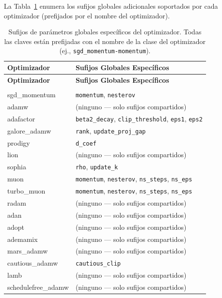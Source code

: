 La Tabla~\ref{tab:optimizer-specific-suffixes} enumera los sufijos globales adicionales soportados por cada optimizador (prefijados por el nombre del optimizador).

\begin{longtable}{>{\ttfamily\footnotesize\raggedright\arraybackslash}p{5.2cm}>{\raggedright\arraybackslash}p{9.7cm}}
\toprule
\textbf{Optimizador} & \textbf{Sufijos Globales Específicos} \\
\midrule
\endfirsthead
\toprule
\textbf{Optimizador} & \textbf{Sufijos Globales Específicos} \\
\midrule
\endhead
\midrule
\multicolumn{2}{r}{\textit{continúa en la página siguiente}} \\
\endfoot
\bottomrule
\caption{Sufijos de parámetros globales específicos del optimizador. Todas las claves están prefijadas con el nombre de la clase del optimizador (ej., \texttt{sgd\_momentum-momentum}).}
\label{tab:optimizer-specific-suffixes}
\endlastfoot
sgd\_momentum & \texttt{momentum}, \texttt{nesterov} \\
adamw & (ninguno --- solo sufijos compartidos) \\
adafactor & \texttt{beta2\_decay}, \texttt{clip\_threshold}, \texttt{eps1}, \texttt{eps2} \\
galore\_adamw & \texttt{rank}, \texttt{update\_proj\_gap} \\
prodigy & \texttt{d\_coef} \\
lion & (ninguno --- solo sufijos compartidos) \\
sophia & \texttt{rho}, \texttt{update\_k} \\
muon & \texttt{momentum}, \texttt{nesterov}, \texttt{ns\_steps}, \texttt{ns\_eps} \\
turbo\_muon & \texttt{momentum}, \texttt{nesterov}, \texttt{ns\_steps}, \texttt{ns\_eps} \\
radam & (ninguno --- solo sufijos compartidos) \\
adan & (ninguno --- solo sufijos compartidos) \\
adopt & (ninguno --- solo sufijos compartidos) \\
ademamix & (ninguno --- solo sufijos compartidos) \\
mars\_adamw & (ninguno --- solo sufijos compartidos) \\
cautious\_adamw & \texttt{cautious\_clip} \\
lamb & (ninguno --- solo sufijos compartidos) \\
schedulefree\_adamw & (ninguno --- solo sufijos compartidos) \\

\end{longtable}
